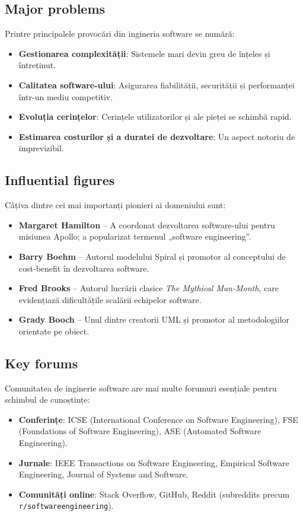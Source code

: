 \documentclass[12pt, letterpaper]{article}
\begin{document}
\subsection*{Major problems}
Printre principalele provocări din ingineria software se numără:
\begin{itemize}
  \item \textbf{Gestionarea complexității}: Sistemele mari devin greu de înțeles și întreținut.
  \item \textbf{Calitatea software-ului}: Asigurarea fiabilității, securității și performanței într-un mediu competitiv.
  \item \textbf{Evoluția cerințelor}: Cerințele utilizatorilor și ale pieței se schimbă rapid.
  \item \textbf{Estimarea costurilor și a duratei de dezvoltare}: Un aspect notoriu de imprevizibil.
\end{itemize}

\subsection*{Influential figures}
Câțiva dintre cei mai importanți pionieri ai domeniului sunt:
\begin{itemize}
  \item \textbf{Margaret Hamilton} – A coordonat dezvoltarea software-ului pentru misiunea Apollo; a popularizat termenul „software engineering”.
  \item \textbf{Barry Boehm} – Autorul modelului Spiral și promotor al conceptului de cost-benefit în dezvoltarea software.
  \item \textbf{Fred Brooks} – Autorul lucrării clasice \emph{The Mythical Man-Month}, care evidențiază dificultățile scalării echipelor software.
  \item \textbf{Grady Booch} – Unul dintre creatorii UML și promotor al metodologiilor orientate pe obiect.
\end{itemize}

\subsection*{Key forums}
Comunitatea de inginerie software are mai multe forumuri esențiale pentru schimbul de cunoștințe:
\begin{itemize}
  \item \textbf{Conferințe}: ICSE (International Conference on Software Engineering), FSE (Foundations of Software Engineering), ASE (Automated Software Engineering).
  \item \textbf{Jurnale}: IEEE Transactions on Software Engineering, Empirical Software Engineering, Journal of Systems and Software.
  \item \textbf{Comunități online}: Stack Overflow, GitHub, Reddit (subreddits precum \texttt{r/softwareengineering}).
\end{itemize}
\end{document}
